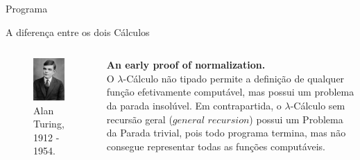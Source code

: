 \documentclass{beamer}
\begin{document}

\begin{frame}{Programa}

\begin{prooftree}
\end{prooftree}

\end{frame}


\begin{frame}{A diferença entre os dois Cálculos}
\begin{columns}
\centering
\begin{figure}
\includegraphics[width=4cm]{turing.jpg}
\caption*{Alan Turing, 1912 - 1954.}
\end{figure}
\textbf{An early proof of normalization. }\\
\justifying
O $\lambda$-Cálculo não tipado permite a definição de qualquer função efetivamente computável, mas possui um problema da parada insolúvel. Em contrapartida, o $\lambda$-Cálculo sem recursão geral ($\textit{general recursion}$) possui um Problema da Parada trivial, pois todo programa termina, mas não consegue representar todas as funções computáveis.

\end{columns} 
\end{frame}




\end{document}
